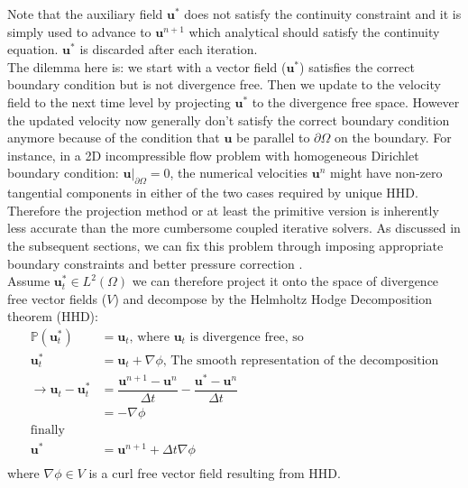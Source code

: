 Note that the auxiliary field $\textbf{u}^*$ does not satisfy the continuity constraint and it is simply used to advance to $\textbf{u}^{n+1}$ which analytical should satisfy the continuity equation. $\textbf{u}^*$ is discarded after each iteration.\\
The dilemma here is: we start with a vector field ($\textbf{u}^*$) satisfies the correct boundary condition but is not divergence free. Then we update to the velocity field to the next time level by projecting $\textbf{u}^*$ to the divergence free space. However the updated velocity now generally don't satisfy the correct boundary condition anymore because of the condition that $\textbf{u}$ be parallel to $\partial \Omega$ on the boundary. For instance, in a 2D incompressible flow problem with homogeneous Dirichlet boundary condition: $\textbf{u}|_{\partial \Omega} = 0$, the numerical velocities $\textbf{u}^n$ might have non-zero tangential components in either of the two cases required by unique HHD. Therefore the projection method or at least the primitive version is inherently less accurate than the more cumbersome coupled iterative solvers. As discussed in the subsequent sections, we can fix this problem through imposing appropriate boundary constraints and better pressure correction \cite{brown2001accurate}.\\

Assume $\textbf{u}^*_t \in \textit{L}^2 (\Omega)$ we can therefore project it onto the space of divergence free vector fields ($\textit{V}$) and decompose by the Helmholtz Hodge Decomposition theorem (HHD):
\begin{equation}
\begin{aligned}
\mathbb{P} (\textbf{u}^*_t) &= \textbf{u}_t, \, \text{where $\textbf{u}_t$ is divergence free, so} \\
\textbf{u}^*_t &= \textbf{u}_t + \nabla \textit{$\phi$}, \, \text{The smooth representation of the decomposition} \\
\rightarrow \textbf{u}_t - \textbf{u}^*_t &= \dfrac{\textbf{u}^{n+1} - \textbf{u}^n}{\Delta t} - \dfrac{\textbf{u}^* - \textbf{u}^n}{\Delta t} \\
&= -\nabla \textit{$\phi$} \\
\text{finally} \\
\textbf{u}^* &= \textbf{u}^{n+1} + \Delta t \nabla \textit{$\phi$} \\
\end{aligned}
\end{equation}
where $\nabla \phi \in \textit{V}$ is a curl free vector field resulting from HHD.\\

